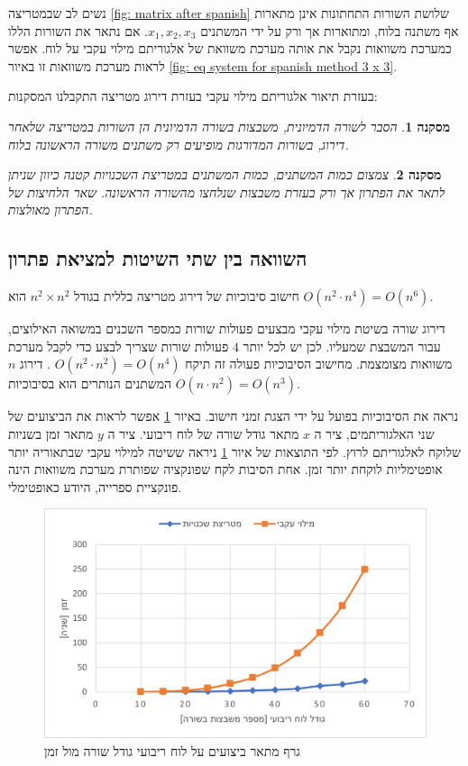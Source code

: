 \documentclass[12pt,leqno]{article}
\theoremstyle{theoremdd}
\newtheorem{corollary}{מסקנה}[section]
\begin{document}
נשים לב שבמטריצה 
\ref{fig: matrix after spanish}
שלושת השורות התחתונות
אינן מתארות אף משתנה בלוח, ומתוארות אך ורק על 
ידי 
המשתנים 
$x_1, x_2, x_3$.
אם נתאר את השורות הללו כמערכת משוואות נקבל
את אותה מערכת משוואת 
של אלגוריתם מילוי עקבי על לוח.
אפשר לראות מערכת משוואות זו באיור 
\ref{fig: eq system for spanish method 3 x 3}.

בעזרת תיאור
אלגוריתם מילוי עקבי 
בעזרת דירוג מטריצה
התקבלנו המסקנות:
\begin{corollary}
    הסבר לשורה הדמיונית,
    משבצות בשורה הדמיונית 
    הן השורות במטריצה
    שלאחר דירוג,
    בשורות המדורגות מופיעים רק משתנים משורה הראשונה בלוח.
\end{corollary}
\begin{corollary}
    צמצום כמות המשתנים,
    כמות המשתנים במטריצת השכנויות
    קטנה
    כיוון 
    שניתן לתאר את הפתרון אך ורק 
    בעזרת משבצות שנלחצו מהשורה הראשונה.
    שאר הלחיצות של הפתרון מאולצות.
\end{corollary}

\subsection{השוואה בין שתי השיטות למציאת פתרון}
חישוב סיבוכיות
של דירוג מטריצה 
כללית
בגודל 
$n^2 \times n^2$
הוא 
$O(n^2 \cdot n^4) = O(n^6)$.

דירוג שורה בשיטת מילוי עקבי 
מבצעים פעולות שורות כמספר השכנים במשואה האילוצים,
עבור המשבצת שמעליו.
לכן יש לכל יותר
$4$
פעולות שורות שצריך לבצע
כדי לקבל מערכת משוואות מצומצמת.
מחישוב הסיבוכיות 
פעולה  זה תיקח
$O(n^2 \cdot n^2) = O(n^4)$
.
דירוג
$n$
המשתנים  
הנותרים
הוא בסיבוכיות 
$O(n \cdot n^2) = O (n^3)$.

נראה את הסיבוכיות בפועל על ידי הצגת זמני חישוב.
באיור 
\ref{fig:prefofmance_diagram}
אפשר לראות את הביצועים
של שני האלגוריתמים, ציר 
ה
$x$
מתאר
גודל שורה של לוח ריבועי.
ציר ה
$y$
מתאר
זמן 
בשניות
שלוקח לאלגוריתם לרוץ.
לפי התוצאות של איור 
\ref{fig:prefofmance_diagram}
ניראה 
ששיטה למילוי עקבי שבתאוריה יותר אופטימליות לוקחת יותר זמן.
אחת הסיבות לקח 
שפונקציה שפותרת מערכת משוואות הינה פונקציית ספרייה,
היודע כאופטימלי.

\begin{figure}[ht]
    \caption{ 
    גרף מתאר ביצועים על לוח ריבועי גודל שורה מול זמן
    }
    \label{fig:prefofmance_diagram}
    \centering
    \includegraphics{images/benchmark.png}
\end{figure}
\end{document}
